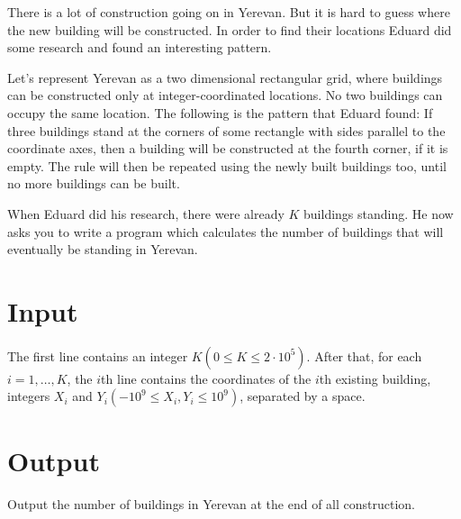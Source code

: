 There is a lot of construction going on in Yerevan.
But it is hard to guess where the new building will be constructed.
In order to find their locations Eduard did some research and found an interesting pattern.

Let's represent Yerevan as a two dimensional rectangular grid, where buildings can be constructed only at integer-coordinated locations.
No two buildings can occupy the same location.
The following is the pattern that Eduard found:
If three buildings stand at the corners of some rectangle with sides parallel to the coordinate axes, then a building will be constructed at the fourth corner, if it is empty.
The rule will then be repeated using the newly built buildings too, until no more buildings can be built.

When Eduard did his research, there were already $K$ buildings standing.
He now asks you to write a program which calculates the number of buildings that will eventually be standing in Yerevan.



\section*{Input}
The first line contains an integer $K (0 \leq K \leq 2 \cdot 10^5)$.
After that, for each $i = 1, \dots, K$, the $i$th line contains the coordinates of the $i$th existing building, integers $X_i$ and $Y_i (−10^9 \leq X_i, Y_i \leq 10^9)$, separated by a space.

\section*{Output}
Output the number of buildings in Yerevan at the end of all construction.
